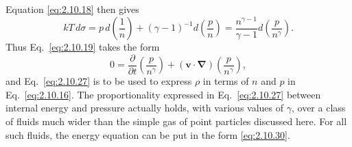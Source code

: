 Equation \eqref{eq:2.10.18} then gives
\begin{equation}
  kT\,d\sigma
  =p\,d\left(\frac1n\right)
   +(\gamma-1)^{-1}d\left(\frac pn\right)
  =\frac{n^{\gamma-1}}{\gamma-1}
   d\left(\frac{p}{n^\gamma}\right).
  \tag{2.10.29}\label{eq:2.10.29}
\end{equation}
Thus Eq.~\eqref{eq:2.10.19} takes the form
\begin{equation}
  0=\frac{\partial}{\partial t}\left(\frac{p}{n^\gamma}\right)
  +(\mathbf v\cdot\boldsymbol{\nabla})
   \left(\frac{p}{n^\gamma}\right),
  \tag{2.10.30}\label{eq:2.10.30}
\end{equation}
and Eq.~\eqref{eq:2.10.27} is to be used to express \(\rho\) in terms of
\(n\) and \(p\) in Eq.~\eqref{eq:2.10.16}. The proportionality expressed
in Eq.~\eqref{eq:2.10.27} between internal energy and pressure actually holds,
with various values of \(\gamma\), over a class of fluids much wider than the
simple gas of point particles discussed here. For all such fluids, the energy
equation can be put in the form \eqref{eq:2.10.30}.

